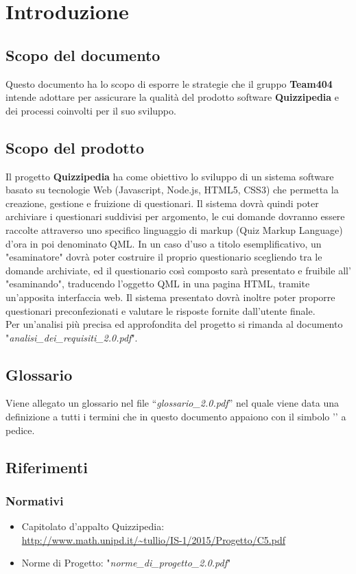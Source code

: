 \documentclass[a4paper,11pt]{article}
\begin{document}
	\newpage
	\section{Introduzione}
	\subsection{Scopo del documento}
	Questo documento ha lo scopo di esporre le strategie che il gruppo \textbf{Team404} intende adottare per assicurare la qualità del prodotto software \textbf{Quizzipedia} e dei processi coinvolti per il suo sviluppo.
	
	
	\subsection{Scopo del prodotto}
	Il progetto \textbf{Quizzipedia} ha come obiettivo lo sviluppo di un sistema software basato su tecnologie Web (Javascript\addglos, Node.js\addglos, HTML5\addglos, CSS3\addglos) che permetta la creazione, gestione e fruizione di questionari. Il sistema dovrà quindi poter archiviare i questionari suddivisi per argomento, le cui domande dovranno essere raccolte attraverso uno specifico linguaggio di markup (Quiz Markup Language) d'ora in poi denominato QML\addglos. In un caso d'uso a titolo esemplificativo, un "esaminatore" dovrà poter costruire il proprio questionario scegliendo tra le domande archiviate, ed il questionario così composto sarà presentato e fruibile all' "esaminando", traducendo l'oggetto QML in una pagina HTML\addglos, tramite un'apposita interfaccia web. Il sistema presentato dovrà inoltre poter proporre questionari preconfezionati e valutare le risposte fornite dall'utente finale.
	\\
	Per un'analisi più precisa ed approfondita del progetto si rimanda al documento\\ "\textit{analisi\_dei\_requisiti\_2.0.pdf}".
	\subsection{Glossario}
	Viene allegato un glossario nel file ``\textit{glossario\_2.0.pdf}'' nel quale viene data una definizione a tutti i termini che in questo documento appaiono con il simbolo '\addglos' a pedice.
	\newpage
	\subsection{Riferimenti}
		\subsubsection{Normativi}
		\begin{itemize}
			\item Capitolato d'appalto Quizzipedia:\\
			\url{http://www.math.unipd.it/~tullio/IS-1/2015/Progetto/C5.pdf}
			\item Norme di Progetto: "\textit{norme\_di\_progetto\_2.0.pdf}"
		\end{itemize}
\end{document}
